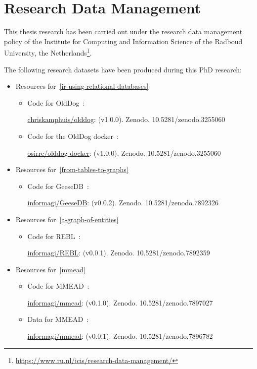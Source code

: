 \chapter*{Research Data Management}
\label{chp:research_data_management}

This thesis research has been carried out under the research data management policy of the Institute for Computing and Information Science of the Radboud University, the Netherlands\footnote{\url{https://www.ru.nl/icis/research-data-management/}}.

The following research datasets have been produced during this PhD research:

\begin{itemize}
	\item Resources for~\cref{ir-using-relational-databases}
	\begin{itemize}
		\item Code for OldDog~\citep{olddog-docker}:
		
		\href{https://doi.org/10.5281/zenodo.7892260}{chriskamphuis/olddog}: (v1.0.0). Zenodo. 10.5281/zenodo.3255060
		
		\item Code for the OldDog docker~\citep{olddog-docker}:
		
		\href{https://doi.org/10.5281/zenodo.3255060}{osirrc/olddog-docker}: (v1.0.0). Zenodo. 10.5281/zenodo.3255060
	\end{itemize}
	
	\item Resources for~\cref{from-tables-to-graphs}
	\begin{itemize}
		\item Code for GeeseDB~\citep{geesedb}:
		
		\href{https://doi.org/10.5281/zenodo.7892326}{informagi/GeeseDB}: (v0.0.2). Zenodo. 10.5281/zenodo.7892326
	\end{itemize}
	
	\item Resources for~\cref{a-graph-of-entities}
	\begin{itemize}
		\item Code for REBL~\citep{rebl}:
		
		\href{https://doi.org/10.5281/zenodo.7892359}{informagi/REBL}: (v0.0.1). Zenodo. 10.5281/zenodo.7892359
	\end{itemize}
	
	\item Resources for~\cref{mmead}
	\begin{itemize}
		\item Code for MMEAD~\citep{mmead}:
		
		\href{https://doi.org/10.5281/zenodo.7897027}{informagi/mmead}: (v0.1.0). Zenodo. 10.5281/zenodo.7897027
		
		\item Data for MMEAD~\citep{mmead}:
		
		\href{https://doi.org/10.5281/zenodo.7896782}{informagi/mmead}: (v0.0.1). Zenodo. 10.5281/zenodo.7896782
	\end{itemize}
	
\end{itemize}